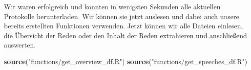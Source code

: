 \documentclass[oneside, 12pt]{scrbook}
\newenvironment{Shaded}{\begin{snugshade}}{\end{snugshade}}
\newcommand{\DataTypeTok}[1]{\textcolor[rgb]{0.13,0.29,0.53}{#1}}
\newcommand{\KeywordTok}[1]{\textcolor[rgb]{0.13,0.29,0.53}{\textbf{#1}}}
\newcommand{\NormalTok}[1]{#1}
\newcommand{\OperatorTok}[1]{\textcolor[rgb]{0.81,0.36,0.00}{\textbf{#1}}}
\newcommand{\OtherTok}[1]{\textcolor[rgb]{0.56,0.35,0.01}{#1}}
\newcommand{\StringTok}[1]{\textcolor[rgb]{0.31,0.60,0.02}{#1}}
\theoremstyle{definition}
\theoremstyle{definition}
\theoremstyle{definition}
\theoremstyle{remark}
\begin{document}
\begin{Shaded}
\end{Shaded}

Wir waren erfolgreich und konnten in wenigsten Sekunden alle aktuellen
Protokolle herunterladen. Wir können sie jetzt auslesen und dabei auch
unsere bereits erstellten Funktionen verwenden. Jetzt können wir alle
Dateien einlesen, die Übersicht der Reden oder den Inhalt der Reden
extrahieren und anschließend auswerten.

\begin{Shaded}
\begin{Highlighting}[]
\KeywordTok{source}\NormalTok{(}\StringTok{"functions/get_overview_df.R"}\NormalTok{)}
\KeywordTok{source}\NormalTok{(}\StringTok{"functions/get_speeches_df.R"}\NormalTok{)}
\end{Highlighting}
\end{Shaded}

\begin{Shaded}
\end{Shaded}
\end{document}
